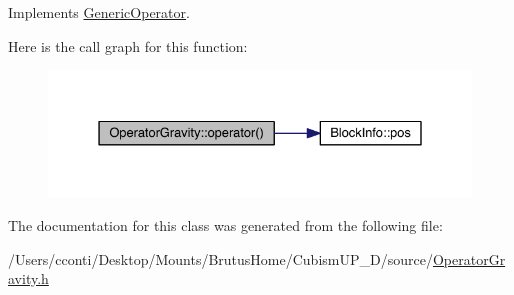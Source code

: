 Implements \hyperlink{class_generic_operator_aacd69e70a1e2d75b97358fca48689a67}{Generic\+Operator}.



Here is the call graph for this function\+:\nopagebreak
\begin{figure}[H]
\begin{center}
\leavevmode
\includegraphics[width=331pt]{d2/d34/class_operator_gravity_a7829a016bf4b27c2213493e363515c90_cgraph}
\end{center}
\end{figure}




The documentation for this class was generated from the following file\+:\begin{DoxyCompactItemize}
\item 
/\+Users/cconti/\+Desktop/\+Mounts/\+Brutus\+Home/\+Cubism\+U\+P\+\_\+D/source/\hyperlink{_operator_gravity_8h}{Operator\+Gravity.\+h}\end{DoxyCompactItemize}
